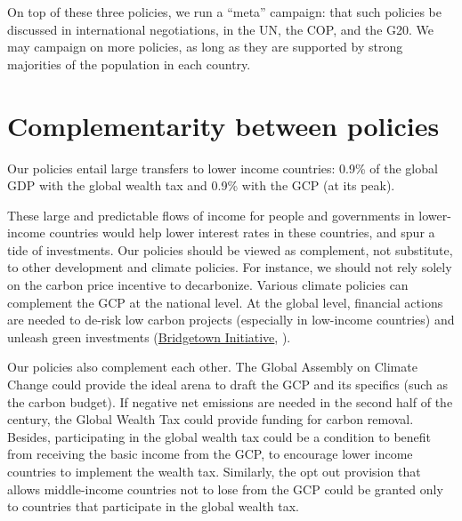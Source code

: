 \documentclass[12pt,english]{article}
\begin{document}
On top of these three policies, we run a ``meta'' campaign: that such policies be discussed in international negotiations, in the UN, the COP, and the G20. 
We may campaign on more policies, as long as they are supported by strong majorities of the population in each country. 

\section{Complementarity between policies}

Our policies entail large transfers to lower income countries: 0.9\% of the global GDP with the global wealth tax and 0.9\% with the GCP (at its peak). 

These large and predictable flows of income for people and governments in lower-income countries would help lower interest rates in these countries, and spur a tide of investments. 
Our policies should be viewed as complement, not substitute, to other development and climate policies. For instance, we should not rely solely on the carbon price incentive to decarbonize. Various climate policies can complement the GCP at the national level. At the global level, financial actions are needed to de-risk low carbon projects (especially in low-income countries) and unleash green investments (\href{https://www.foreign.gov.bb/the-2022-barbados-agenda/}{Bridgetown Initiative}, \citealp{hourcade_accelerating_2021}). 

Our policies also complement each other. The Global Assembly on Climate Change could provide the ideal arena to draft the GCP and its specifics (such as the carbon budget). If negative net emissions are needed in the second half of the century, the Global Wealth Tax could provide funding for carbon removal. Besides, participating in the global wealth tax could be a condition to benefit from receiving the basic income from the GCP, to encourage lower income countries to implement the wealth tax. Similarly, the opt out provision that allows middle-income countries not to lose from the GCP could be granted only to countries that participate in the global wealth tax.

\end{document}
